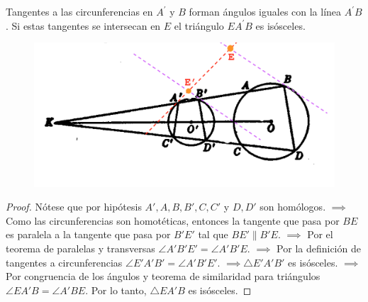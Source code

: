 





\begin{problema}
	Tangentes a las circunferencias en $A^{\prime}$ y $B$ forman ángulos iguales con la línea $A^{\prime} B $. Si estas tangentes se intersecan en $E$ el triángulo $E A^{\prime} B$ es isósceles.
	\begin{figure}[H]
		\centering
		\includegraphics[scale=0.2]{Images/1}
	\end{figure}
\end{problema}
\begin{proof}
	Nótese que por hipótesis $A',A,B,B',C,C'$ y $D,D'$ son homólogos. $\implies$ Como las circunferencias son homotéticas, entonces la tangente que pasa por $BE$ es paralela a la tangente que pasa por  $B'E'$ tal que $BE'\parallel B'E$. $\implies$ Por el teorema de paralelas y transversas $\angle A'B'E' = \angle A'B'E$. $\implies$ Por la definición de tangentes a circunferencias $\angle E'A'B' = \angle A'B'E'$. $\implies \triangle E'A'B'$ es isósceles. $\implies$ Por congruencia de los ángulos y teorema de similaridad para triángulos $\angle EA'B = \angle A'BE$. Por lo tanto, $\triangle EA'B$ es isósceles.
\end{proof}


